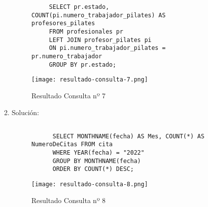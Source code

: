 \begin{enumerate}
\begin{figure}[H]
\begin{tcolorbox}[sharp corners, colback=yellow!30, colframe=white!20]
\begin{verbatim}
     SELECT pr.estado, COUNT(pi.numero_trabajador_pilates) AS profesores_pilates
     FROM profesionales pr
     LEFT JOIN profesor_pilates pi
     ON pi.numero_trabajador_pilates = pr.numero_trabajador
     GROUP BY pr.estado;
            \end{verbatim}
        \end{tcolorbox}
    \end{figure}

    \begin{figure}[H]
        \centering
        \texttt{[image: resultado-consulta-7.png]}
        \caption{Resultado Consulta nº 7}
    \end{figure}

    \item Solución:

    \begin{figure}[H]
        \begin{tcolorbox}[sharp corners, colback=yellow!30, colframe=white!20]
            \scriptsize
            \begin{verbatim}

      SELECT MONTHNAME(fecha) AS Mes, COUNT(*) AS NumeroDeCitas FROM cita
      WHERE YEAR(fecha) = "2022"
      GROUP BY MONTHNAME(fecha)
      ORDER BY COUNT(*) DESC;
            \end{verbatim}
        \end{tcolorbox}
    \end{figure}

    \begin{figure}[H]
        \centering
        \texttt{[image: resultado-consulta-8.png]}
        \caption{Resultado Consulta nº 8}
    \end{figure}
\end{enumerate}



%
%


